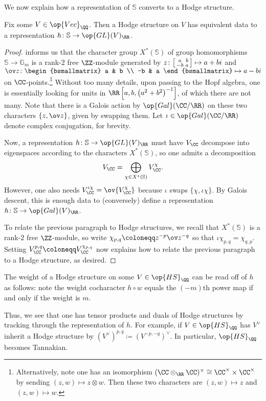 \documentclass{article}
\begin{document}
We now explain how a representation of $\mathbb S$ converts to a Hodge structure.
\begin{lemma} \label{lem:hodge-by-s}
	Fix some $V\in\op{Vec}_\QQ$. Then a Hodge structure on $V$ has equivalent data to a representation $h\colon\mathbb S\to\op{GL}(V)_\RR$.
\end{lemma}
\begin{proof}
	 informs us that the character group $X^*(\mathbb S)$ of group homomorphisms $\mathbb S\to\mathbb G_m$ is a rank-$2$ free $\ZZ$-module generated by $z\colon\begin{bsmallmatrix}
		a & b \\ -b & a
	\end{bsmallmatrix}\mapsto a+bi$ and $\ov z\colon\begin{bsmallmatrix}
		a & b \\ -b & a
	\end{bsmallmatrix}\mapsto a-bi$ on $\CC$-points.\footnote{Alternatively, note one has an isomorphism $(\CC\otimes_\RR\CC)^\times\cong\CC^\times\times\CC^\times$ by sending $(z,w)\mapsto z\otimes w$. Then these two characters are $(z,w)\mapsto z$ and $(z,w)\mapsto w$.} Without too many details, upon passing to the Hopf algebra, one is essentially looking for units in $\RR\left[a,b,\left(a^2+b^2\right)^{-1}\right]$, of which there are not many. Note that there is a Galois action by $\op{Gal}(\CC/\RR)$ on these two characters $\{z,\ov z\}$, given by swapping them. Let $\iota\in\op{Gal}(\CC/\RR)$ denote complex conjugation, for brevity.

	Now, a representation $h\colon\mathbb S\to\op{GL}(V)_\RR$ must have $V_\CC$ decompose into eigenspaces according to the characters $X^*(\mathbb S)$, so one admits a decomposition
	\[V_\CC=\bigoplus_{\chi\in X^*(\mathbb S)}V_\CC^\chi.\]
	However, one also needs $V_\CC^{\iota\chi}=\ov{V_\CC^\chi}$ because $\iota$ swaps $\{\chi,\iota\chi\}$. By Galois descent, this is enough data to (conversely) define a representation $h\colon\mathbb S\to\op{Gal}(V)_\RR$.

	To relate the previous paragraph to Hodge structures, we recall that $X^*(\mathbb S)$ is a rank-$2$ free $\ZZ$-module, so write $\chi_{p,q}\coloneqq z^{-p}\ov z^{-q}$ so that $\iota\chi_{p,q}=\chi_{q,p}$. Setting $V_\CC^{p,q}\coloneqq V_\CC^{\chi_{p,q}}$ now explains how to relate the previous paragraph to a Hodge structure, as desired.
\end{proof}
\begin{remark}
	The weight of a Hodge structure on some $V\in\op{HS}_\QQ$ can be read off of $h$ as follows: note the weight cocharacter $h\circ w$ equals the $(-m)$th power map if and only if the weight is $m$. 
\end{remark}
Thus, we see that one has tensor products and duals of Hodge structures by tracking through the representation of $h$. For example, if $V\in\op{HS}_\QQ$ has $V^\lor$ inherit a Hodge structure by $(V^\lor)^{p,q}\coloneqq (V^{-p,-q})^\lor$. In particular, $\op{HS}_\QQ$ becomes Tannakian.\todo{}
\end{document}
